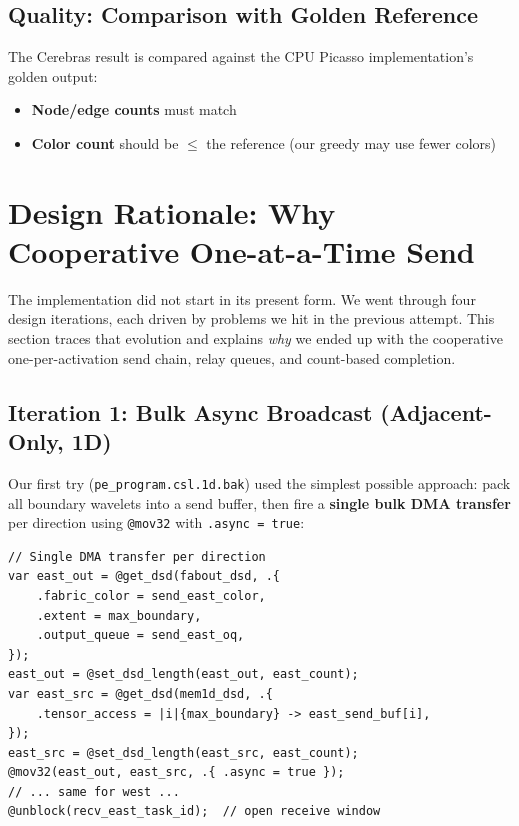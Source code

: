 \documentclass[11pt,letterpaper]{article}
\begin{document}
\subsection{Quality: Comparison with Golden Reference}

The Cerebras result is compared against the CPU Picasso implementation's golden output:
\begin{itemize}[nosep]
  \item \textbf{Node/edge counts} must match
  \item \textbf{Color count} should be $\leq$ the reference (our greedy may use fewer colors)
\end{itemize}

\section{Design Rationale: Why Cooperative One-at-a-Time Send}
\label{sec:rationale}

The implementation did not start in its present form. We went through four design iterations, each driven by problems we hit in the previous attempt. This section traces that evolution and explains \emph{why} we ended up with the cooperative one-per-activation send chain, relay queues, and count-based completion.

\subsection{Iteration 1: Bulk Async Broadcast (Adjacent-Only, 1D)}

Our first try (\texttt{pe\_program.csl.1d.bak}) used the simplest possible approach: pack all boundary wavelets into a send buffer, then fire a \textbf{single bulk DMA transfer} per direction using \texttt{@mov32} with \texttt{.async = true}:

\begin{lstlisting}[language=CSL, caption={Original bulk-send approach (\texttt{pe\_program.csl.1d.bak})}, label=lst:oldsend]
// Single DMA transfer per direction
var east_out = @get_dsd(fabout_dsd, .{
    .fabric_color = send_east_color,
    .extent = max_boundary,
    .output_queue = send_east_oq,
});
east_out = @set_dsd_length(east_out, east_count);
var east_src = @get_dsd(mem1d_dsd, .{
    .tensor_access = |i|{max_boundary} -> east_send_buf[i],
});
east_src = @set_dsd_length(east_src, east_count);
@mov32(east_out, east_src, .{ .async = true });
// ... same for west ...
@unblock(recv_east_task_id);  // open receive window
\end{lstlisting}
\end{document}
